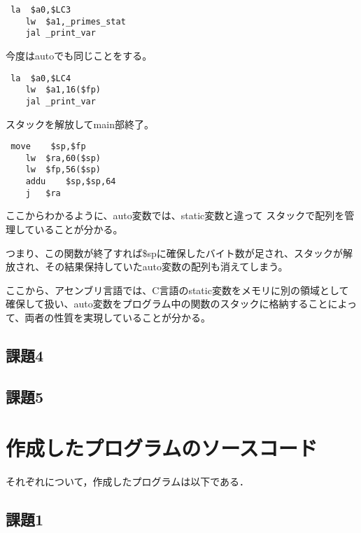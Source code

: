 \documentclass[a4j]{jarticle}
\begin{document}
\begin{verbatim}
 la  $a0,$LC3
    lw  $a1,_primes_stat
    jal _print_var
\end{verbatim}

今度はautoでも同じことをする。

\begin{verbatim}
 la  $a0,$LC4
    lw  $a1,16($fp)
    jal _print_var
\end{verbatim}

スタックを解放してmain部終了。

\begin{verbatim}
 move    $sp,$fp
    lw  $ra,60($sp)
    lw  $fp,56($sp)
    addu    $sp,$sp,64
    j   $ra
\end{verbatim}

ここからわかるように、auto変数では、static変数と違って スタックで配列を管理していることが分かる。

つまり、この関数が終了すれば\$spに確保したバイト数が足され、スタックが解放され、その結果保持していたauto変数の配列も消えてしまう。

ここから、アセンブリ言語では、C言語のstatic変数をメモリに別の領域として確保して扱い、auto変数をプログラム中の関数のスタックに格納することによって、両者の性質を実現していることが分かる。


\subsection{課題4}
\subsection{課題5}



\newpage

%
%

\section{作成したプログラムのソースコード}

それぞれについて，作成したプログラムは以下である．

\subsection{課題1}

% 

% 
\end{document}
